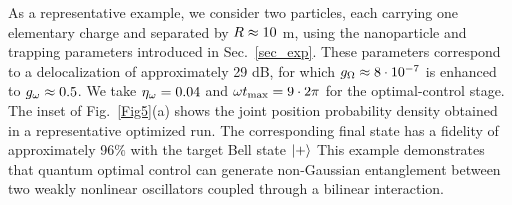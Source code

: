 \documentclass[reprint,prx,footinbib,floatfix,twocolumn,longbibliography,superscriptaddress]{revtex4-2}
\begin{document}
As a representative example, we consider two particles, each carrying one elementary charge and separated by $R \approx 10$ {\textmu}m, using the nanoparticle and trapping parameters introduced in Sec.~\ref{sec_exp}.
These parameters correspond to a delocalization of approximately 29 dB, for which $g_\Omega \approx 8 \cdot 10^{-7}$ is enhanced to $g_\omega \approx 0.5$.
We take $\eta_\omega = 0.04$ and $\omega t_\text{max} = 9 \cdot 2 \pi$ for the optimal-control stage.
The inset of Fig.~\ref{Fig5}(a) shows the joint position probability density obtained in a representative optimized run.
The corresponding final state has a fidelity of approximately 96$\%$ with the target Bell state $\ket{+}$
This example demonstrates that quantum optimal control can generate non-Gaussian entanglement between two weakly nonlinear oscillators coupled through a bilinear interaction.
\end{document}

